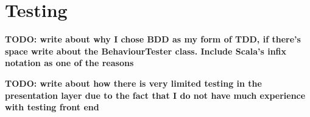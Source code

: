 \section{Testing} \label{sec:Testing}

\textbf{TODO: write about why I chose BDD as my form of TDD, if there's space
write about the BehaviourTester class. Include Scala's infix notation as one of
the reasons}

\textbf{TODO: write about how there is very limited testing in the presentation
layer due to the fact that I do not have much experience with testing front
end}

